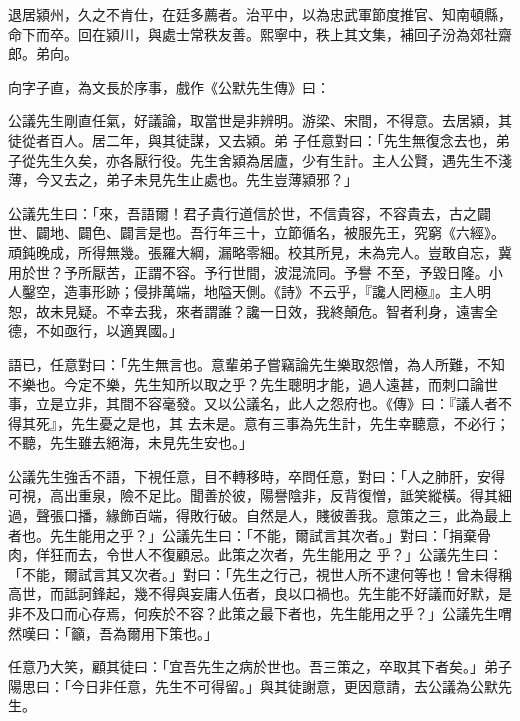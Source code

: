 \begin{pinyinscope}
 退居潁州，久之不肯仕，在廷多薦者。治平中，以為忠武軍節度推官、知南頓縣，命下而卒。回在潁川，與處士常秩友善。熙寧中，秩上其文集，補回子汾為郊社齋郎。弟向。



 向字子直，為文長於序事，戲作《公默先生傳》曰：



 公議先生剛直任氣，好議論，取當世是非辨明。游梁、宋間，不得意。去居潁，其徒從者百人。居二年，與其徒謀，又去潁。弟
 子任意對曰：「先生無復念去也，弟子從先生久矣，亦各厭行役。先生舍潁為居廬，少有生計。主人公賢，遇先生不淺薄，今又去之，弟子未見先生止處也。先生豈薄潁邪？」



 公議先生曰：「來，吾語爾！君子貴行道信於世，不信貴容，不容貴去，古之闢世、闢地、闢色、闢言是也。吾行年三十，立節循名，被服先王，究窮《六經》。頑鈍晚成，所得無幾。張羅大綱，漏略零細。校其所見，未為完人。豈敢自忘，冀用於世？予所厭苦，正謂不容。予行世間，波混流同。予譽
 不至，予毀日隆。小人鑿空，造事形跡；侵排萬端，地隘天側。《詩》不云乎，『讒人罔極』。主人明恕，故未見疑。不幸去我，來者謂誰？讒一日效，我終顛危。智者利身，遠害全德，不如亟行，以適異國。」



 語已，任意對曰：「先生無言也。意輩弟子嘗竊論先生樂取怨憎，為人所難，不知不樂也。今定不樂，先生知所以取之乎？先生聰明才能，過人遠甚，而刺口論世事，立是立非，其間不容毫發。又以公議名，此人之怨府也。《傳》曰：『議人者不得其死』，先生憂之是也，其
 去未是。意有三事為先生計，先生幸聽意，不必行；不聽，先生雖去絕海，未見先生安也。」



 公議先生強舌不語，下視任意，目不轉移時，卒問任意，對曰：「人之肺肝，安得可視，高出重泉，險不足比。聞善於彼，陽譽陰非，反背復憎，詆笑縱橫。得其細過，聲張口播，緣飾百端，得敗行破。自然是人，賤彼善我。意策之三，此為最上者也。先生能用之乎？」公議先生曰：「不能，爾試言其次者。」對曰：「捐棄骨肉，佯狂而去，令世人不復顧忌。此策之次者，先生能用之
 乎？」公議先生曰：「不能，爾試言其又次者。」對曰：「先生之行己，視世人所不逮何等也！曾未得稱高世，而詆訶鋒起，幾不得與妄庸人伍者，良以口禍也。先生能不好議而好默，是非不及口而心存焉，何疾於不容？此策之最下者也，先生能用之乎？」公議先生喟然嘆曰：「籲，吾為爾用下策也。」



 任意乃大笑，顧其徒曰：「宜吾先生之病於世也。吾三策之，卒取其下者矣。」弟子陽思曰：「今日非任意，先生不可得留。」與其徒謝意，更因意請，去公議為公默先
 生。




\end{pinyinscope}
